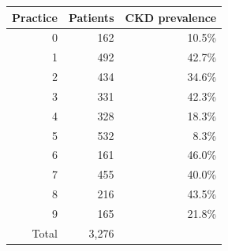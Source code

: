 \begin{tabular}{rrr}
    \toprule
    Practice & Patients & CKD prevalence \\
    \midrule
    0 & 162 & 10.5\% \\
    1 & 492 & 42.7\% \\
    2 & 434 & 34.6\% \\
    3 & 331 & 42.3\% \\
    4 & 328 & 18.3\% \\
    5 & 532 & 8.3\% \\
    6 & 161 & 46.0\% \\
    7 & 455 & 40.0\% \\
    8 & 216 & 43.5\% \\
    9 & 165 & 21.8\% \\
    \midrule
    Total & 3,276 & \\
    \bottomrule
\end{tabular}
